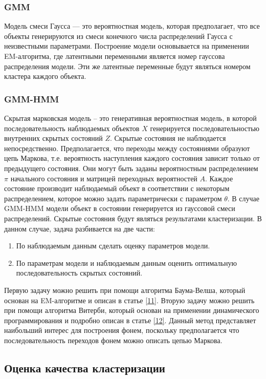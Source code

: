 \documentclass[a4paper,14pt]{extarticle}
\begin{document}
\subsubsection{GMM}
Модель смеси Гаусса — это вероятностная модель, которая предполагает, что все объекты генерируются из смеси конечного числа распределений Гаусса с неизвестными параметрами. Построение модели основывается на применении EM-алгоритма, где латентными переменными является номер гауссова распределения модели. Эти же латентные переменные будут являться номером кластера каждого объекта.

\subsubsection{GMM-HMM}
Скрытая марковская модель – это генеративная вероятностная модель, в которой последовательность наблюдаемых объектов $X$ генерируется последовательностью внутренних скрытых состояний $Z$. Скрытые состояния не наблюдается непосредственно. Предполагается, что переходы между состояниями образуют цепь Маркова, т.е. вероятность наступления каждого состояния зависит только от предыдущего состояния. Они могут быть заданы вероятностным распределением $\pi$ начального состояния и матрицей переходных вероятностей $A$. Каждое состояние производит наблюдаемый объект в соответствии с некоторым распределением, которое можно задать параметрически с параметром $\theta$.  В случае GMM-HMM модели объект в состоянии генерируется из гауссовой смеси распределений.
Скрытые состояния будут являться результатами кластеризации. В данном случае, задача разбивается на две части:
\begin{enumerate}
	\item По наблюдаемым данным сделать оценку параметров модели.
	\item По параметрам модели и наблюдаемым данным оценить оптимальную последовательность скрытых состояний.
\end{enumerate}
Первую задачу можно решить при помощи алгоритма Баума-Велша, который основан на EM-алгоритме и описан в статье \hyperlink{b_11}{[11]}. Вторую задачу можно решить при помощи алгоритма Витерби, который основан на применении динамического программирования и подробно описан в статье \hyperlink{b_12}{[12]}. Данный метод представляет наибольший интерес для построения фонем, поскольку предполагается что последовательность переходов фонем можно описать цепью Маркова.

\subsection{Оценка качества кластеризации}
\end{document}
